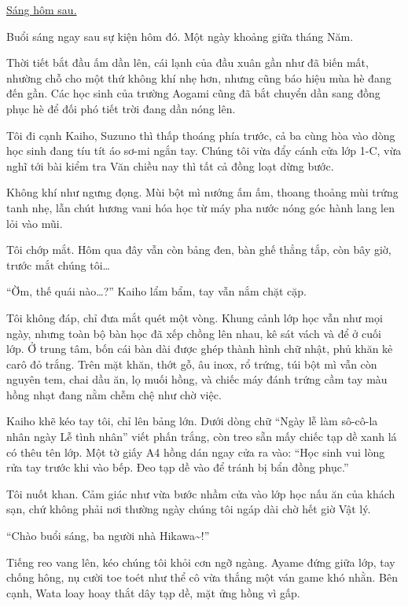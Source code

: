 \documentclass[../main.tex]{subfiles}
\begin{document}
\il

\begin{center}
  \uline{Sáng hôm sau.}
\end{center}

Buổi sáng ngay sau sự kiện hôm đó. Một ngày khoảng giữa tháng Năm.

Thời tiết bắt đầu ấm dần lên, cái lạnh của đầu xuân gần như đã biến mất, nhường chỗ cho một thứ không khí nhẹ hơn, nhưng cũng báo hiệu mùa hè đang đến gần. Các học sinh của trường Aogami cũng đã bắt chuyển dần sang đồng phục hè để đối phó tiết trời đang dần nóng lên.

Tôi đi cạnh Kaiho, Suzuno thì thấp thoáng phía trước, cả ba cùng hòa vào dòng học sinh đang tíu tít áo sơ-mi ngắn tay. Chúng tôi vừa đẩy cánh cửa lớp 1-C, vừa nghĩ tới bài kiểm tra Văn chiều nay thì tất cả đồng loạt dừng bước.

Không khí như ngưng đọng. Mùi bột mì nướng ấm ấm, thoang thoảng mùi trứng tanh nhẹ, lẫn chút hương vani hóa học từ máy pha nước nóng góc hành lang len lỏi vào mũi.

Tôi chớp mắt. Hôm qua đây vẫn còn bảng đen, bàn ghế thẳng tắp, còn bây giờ, trước mắt chúng tôi\dots

``Ờm, thế quái nào\dots?'' Kaiho lẩm bẩm, tay vẫn nắm chặt cặp.

Tôi không đáp, chỉ đưa mắt quét một vòng. Khung cảnh lớp học vẫn như mọi ngày, nhưng toàn bộ bàn học đã xếp chồng lên nhau, kê sát vách và để ở cuối lớp. Ở trung tâm, bốn cái bàn dài được ghép thành hình chữ nhật, phủ khăn kẻ carô đỏ trắng. Trên mặt khăn, thớt gỗ, âu inox, rổ trứng, túi bột mì vẫn còn nguyên tem, chai dầu ăn, lọ muối hồng, và chiếc máy đánh trứng cầm tay màu hồng nhạt đang nằm chễm chệ như chờ việc.

Kaiho khẽ kéo tay tôi, chỉ lên bảng lớn. Dưới dòng chữ ``Ngày lễ làm sô-cô-la nhân ngày Lễ tình nhân'' viết phấn trắng, còn treo sẵn mấy chiếc tạp dề xanh lá có thêu tên lớp. Một tờ giấy A4 hồng dán ngay cửa ra vào: ``Học sinh vui lòng rửa tay trước khi vào bếp. Đeo tạp dề vào để tránh bị bẩn đồng phục.''

Tôi nuốt khan. Cảm giác như vừa bước nhầm cửa vào lớp học nấu ăn của khách sạn, chứ không phải nơi thường ngày chúng tôi ngáp dài chờ hết giờ Vật lý.

``Chào buổi sáng, ba người nhà Hikawa\~{}!''

Tiếng reo vang lên, kéo chúng tôi khỏi cơn ngỡ ngàng. Ayame đứng giữa lớp, tay chống hông, nụ cười toe toét như thể cô vừa thắng một ván game khó nhằn. Bên cạnh, Wata loay hoay thắt dây tạp dề, mặt ửng hồng vì gấp.
\end{document}
